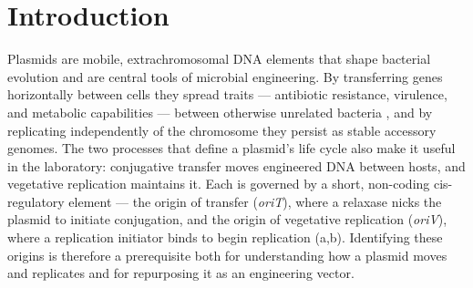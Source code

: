 %
%
%

\section*{Introduction}
\label{sec:intro}

Plasmids are mobile, extrachromosomal DNA elements that shape bacterial
evolution and are central tools of microbial engineering. By transferring
genes horizontally between cells they spread traits --- antibiotic
resistance, virulence, and metabolic capabilities --- between otherwise
unrelated bacteria
\cite{rodriguezbeltran2021beyond,castanedabarba2024plasmids,frost2005mobile},
and by replicating independently of the chromosome they persist as stable
accessory genomes. The two processes that define a plasmid's life cycle also
make it useful in the laboratory: conjugative transfer moves engineered DNA
between hosts, and vegetative replication maintains it. Each is governed by a
short, non-coding cis-regulatory element --- the origin of transfer
(\emph{oriT}), where a relaxase nicks the plasmid to initiate conjugation,
and the origin of vegetative replication (\emph{oriV}), where a replication
initiator binds to begin replication (a,b).
Identifying these origins is therefore a prerequisite both for understanding
how a plasmid moves and replicates and for repurposing it as an engineering
vector.

